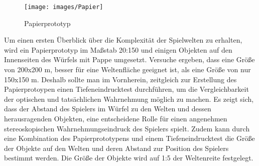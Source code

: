 
\begin{figure}[!htbp]%
	\centering
		\texttt{[image: images/Papier]}
	\caption{Papierprototyp}
	\label{fig:Papierprototyp}
\end{figure}

Um einen ersten Überblick über die Komplexität der Spielwelten zu erhalten, wird ein Papierprototyp im Maßstab 20:150 und einigen Objekten auf den Innenseiten des Würfels mit Pappe umgesetzt. Versuche ergeben, dass eine Größe von 200x200 m, besser für eine Weltenfläche geeignet ist, als eine Größe von nur 150x150 m. Deshalb sollte man im Vornherein, zeitgleich zur Erstellung des Papierprotoypen einen Tiefeneindrucktest durchführen, um die Vergleichbarkeit der optischen und tatsächlichen Wahrnehmung möglich zu machen. Es zeigt sich, dass der Abstand des Spielers im Würfel zu den Welten und dessen herausragenden Objekten, eine entscheidene Rolle für einen angenehmen stereoskopischen Wahrnehmungseindruck des Spielers spielt. Zudem kann durch eine Kombination des Papierprototypens und einem Tiefeneindrucktest die Größe der Objekte auf den Welten und deren Abstand zur Position des Spielers bestimmt werden. Die Größe der Objekte wird auf 1:5 der Weltenreite festgelegt.